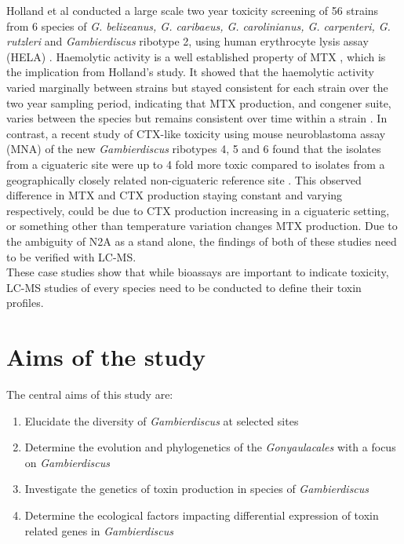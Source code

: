 \documentclass[12pt]{article}
\begin{document}
Holland et al conducted a large scale two year toxicity screening of 56 strains from 6 species of \emph{G. belizeanus, G. caribaeus, G. carolinianus, G. carpenteri, G. rutzleri} and  \emph{Gambierdiscus} ribotype 2, using human erythrocyte lysis assay (HELA) \cite{holland2013differences}. Haemolytic activity is a well established property of MTX \cite{igarashi1999mechanisms}, which is the implication from Holland's study. It showed that the haemolytic activity varied marginally between strains but stayed consistent for each strain over the two year sampling period, indicating that MTX production, and congener suite, varies between the species but remains consistent over time within a strain \cite{holland2013differences}.
In contrast, a recent study of CTX-like toxicity using mouse neuroblastoma assay (MNA) of the new \emph{Gambierdiscus} ribotypes 4, 5 and 6 found that the isolates from a ciguateric site were up to 4\- fold more toxic compared to isolates from a geographically closely related non-ciguateric reference site \cite{xu2014distribution}. This observed difference in MTX and CTX production staying constant and varying respectively, could be due to CTX production increasing in a ciguateric setting, or something other than temperature variation changes MTX production. Due to the ambiguity of N2A as a stand alone, the findings of both of these studies need to be verified with LC-MS. \\

These case studies show that while bioassays are important to indicate toxicity, LC-MS studies of every species need to be conducted to define their toxin profiles.



\section{Aims of the study}
The central aims of this study are:
\begin{enumerate}
\item Elucidate the diversity of \emph{Gambierdiscus} at selected sites
\item Determine the evolution and phylogenetics of the \emph{Gonyaulacales} with a focus on \emph{Gambierdiscus}
\item Investigate the genetics of toxin production in species of \emph{Gambierdiscus}
\item Determine the ecological factors impacting differential expression of toxin related genes in \emph{Gambierdiscus}
\end{enumerate}
\end{document}
